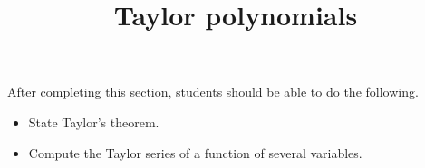 \documentclass{ximera}
\title{Taylor polynomials}
\begin{document}
\begin{abstract}
\end{abstract}

\maketitle

\begin{sectionOutcomes}

After completing this section, students should be able to do the following.

\begin{itemize}
\item State Taylor's theorem. 
\item Compute the Taylor series of a function of several variables. 
\end{itemize}

\end{sectionOutcomes}
\end{document}
